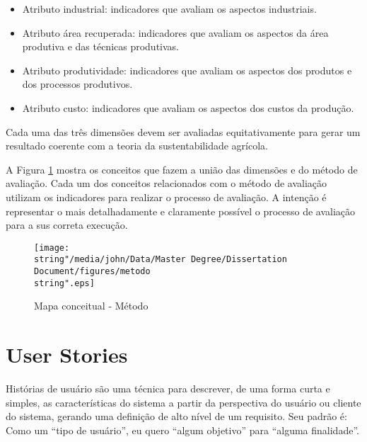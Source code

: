 \begin{itemize}
\item Atributo industrial: indicadores que avaliam os aspectos industriais. 
\item Atributo área recuperada: indicadores que avaliam os aspectos da área
produtiva e das técnicas produtivas.
\item Atributo produtividade: indicadores que avaliam os aspectos dos produtos
e dos processos produtivos.
\item Atributo custo: indicadores que avaliam os aspectos dos custos da
produção. 
\end{itemize}
Cada uma das três dimensões devem ser avaliadas equitativamente para
gerar um resultado coerente com a teoria da sustentabilidade agrícola.

A Figura \ref{fig:Method} mostra os conceitos que fazem a união das
dimensões e do método de avaliação. Cada um dos conceitos relacionados
com o método de avaliação utilizam os indicadores para realizar o
processo de avaliação. A intenção é representar o mais detalhadamente
e claramente possível o processo de avaliação para a sus correta execução.

\begin{figure}
\begin{centering}
\texttt{[image: \\string"/media/john/Data/Master Degree/Dissertation Document/figures/metodo\\string".eps]}
\par\end{centering}
\caption{Mapa conceitual - Método\label{fig:Method}}
\end{figure}


\section{User Stories}

Histórias de usuário são uma técnica para descrever, de uma forma
curta e simples, as características do sistema a partir da perspectiva
do usuário ou cliente do sistema, gerando uma definição de alto nível
de um requisito. Seu padrão é: Como um “tipo de usuário”, eu quero
“algum objetivo” para “alguma finalidade”.

